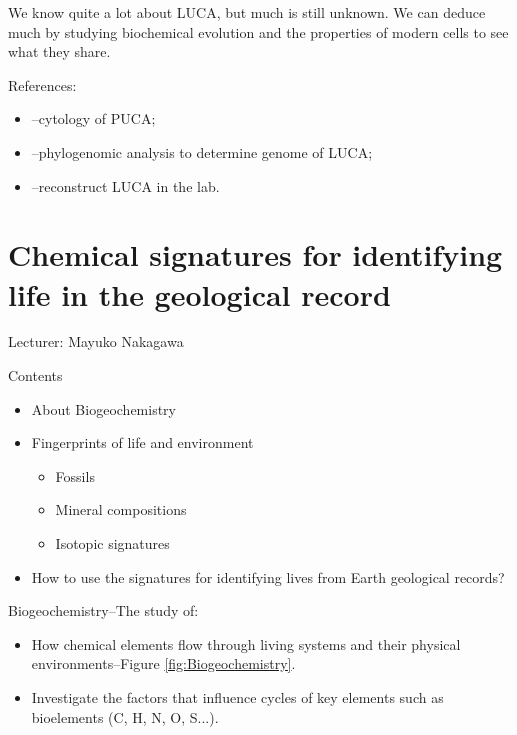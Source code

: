 \documentclass[]{article}
\begin{document}
We know quite a lot about LUCA, but much is still unknown. We can deduce much by studying biochemical evolution and the properties of modern cells to see what they share.

References:
\begin{itemize}
	\item \cite{penny1999nature}--cytology of PUCA;
	\item \cite{weiss2016physiology}--phylogenomic analysis to determine genome of LUCA;
	\item \cite{torino2013piecing}--reconstruct LUCA in the lab.
\end{itemize}

\section{Chemical signatures for identifying life in the geological record}

Lecturer: Mayuko Nakagawa

Contents
\begin{itemize}
	\item About Biogeochemistry
	\item Fingerprints of life and environment
	\begin{itemize}
		\item Fossils
		\item Mineral compositions
		\item Isotopic signatures
	\end{itemize}
	\item How to use the signatures for identifying lives from 	Earth geological records?
\end{itemize}

Biogeochemistry--The study of:
\begin{itemize}
	\item How chemical elements flow through living systems and their physical environments--Figure \ref{fig:Biogeochemistry}\cite{linares-pasten_2018}.
	\item Investigate the factors that influence cycles of key 	elements such as bioelements (C, H, N, O, S...).
	
\end{itemize}
\end{document}
